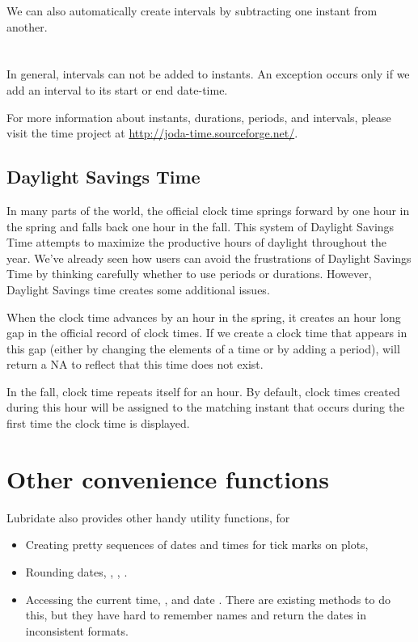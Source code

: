\documentclass[article]{jss}
\begin{document}
We can also automatically create intervals by subtracting one instant from another.\\

\\
\\

In general, intervals can not be added to instants. An exception occurs only if we add an interval to its start or end date-time.

For more information about instants, durations, periods, and intervals, please visit the  time project at  \url{http://joda-time.sourceforge.net/}. 

\subsection{Daylight Savings Time}
\label{sec:DST}

In many parts of the world, the official clock time springs forward by one hour in the spring and falls back one hour in the fall. This system of Daylight Savings Time attempts to maximize the productive hours of daylight throughout the year. We've already seen how  users can avoid the frustrations of Daylight Savings Time by thinking carefully whether to use periods or durations. However, Daylight Savings time creates some additional issues.

When the clock time advances by an hour in the spring, it creates an hour long gap in the official record of clock times. If we create a clock time that appears in this gap (either by changing the elements of a time or by adding a period),  will return a NA to reflect that this time does not exist.

In the fall, clock time repeats itself for an hour. By default, clock times created during this hour will be assigned to the matching instant that occurs during the first time the clock time is displayed.

\section{Other convenience functions}
\label{sec:utils}

Lubridate also provides other handy utility functions, for

\begin{itemize}
  \item Creating pretty sequences of dates and times for tick marks on plots, 
  
  \item Rounding dates, , , .

  \item Accessing the current time, , and date .  There are existing methods to do this, but they have hard to remember names and return the dates in inconsistent formats.
  
\end{itemize}
\end{document}
